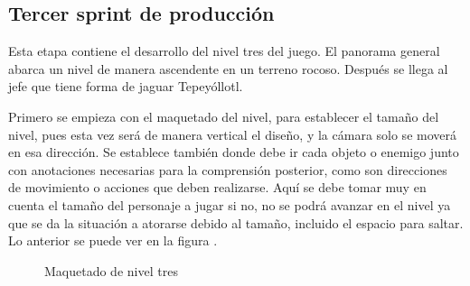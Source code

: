 

\subsection{Tercer sprint de producción}
Esta etapa contiene el desarrollo del nivel tres del juego. El panorama general abarca un nivel de manera ascendente en un terreno rocoso. Después se llega al jefe que tiene forma de jaguar Tepeyóllotl.

Primero se empieza con el maquetado del nivel, para establecer el tamaño del nivel, pues esta vez será de manera vertical el diseño, y la cámara solo se moverá en esa dirección. Se establece también donde debe ir cada objeto o enemigo junto con anotaciones necesarias para la comprensión posterior, como son direcciones de movimiento o acciones que deben realizarse. Aquí se debe tomar muy en cuenta el tamaño del personaje a jugar si no, no se podrá avanzar en el nivel ya que se da la situación a atorarse debido al tamaño, incluido el espacio para saltar. Lo anterior se puede ver en la figura \cite{fig:n01}.
\begin{figure}[htbp]
	\centering
	\caption{Maquetado de nivel tres} \label{fig:n01}
\end{figure}  

